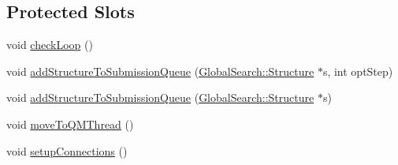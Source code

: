 \subsection*{Protected Slots}
\begin{DoxyCompactItemize}
\item 
void \hyperlink{classGlobalSearch_1_1QueueManager_a14256e9fd1827889506d8a767c19d55a}{check\-Loop} ()
\item 
void \hyperlink{classGlobalSearch_1_1QueueManager_a01a7a54687dfcf9929e274a0e451e52a}{add\-Structure\-To\-Submission\-Queue} (\hyperlink{classGlobalSearch_1_1Structure}{Global\-Search\-::\-Structure} $\ast$s, int opt\-Step)
\item 
void \hyperlink{classGlobalSearch_1_1QueueManager_a1eb84caa0ddac997149487cffb30074a}{add\-Structure\-To\-Submission\-Queue} (\hyperlink{classGlobalSearch_1_1Structure}{Global\-Search\-::\-Structure} $\ast$s)
\item 
void \hyperlink{classGlobalSearch_1_1QueueManager_a34f54a19ab868ce38fea4d27c27d60d8}{move\-To\-Q\-M\-Thread} ()
\item 
void \hyperlink{classGlobalSearch_1_1QueueManager_a3c2e07f49b09be24271551d85b7f312f}{setup\-Connections} ()
\end{DoxyCompactItemize}
